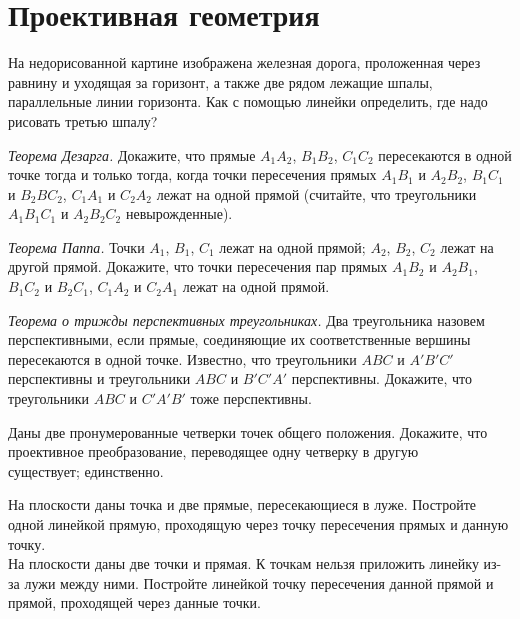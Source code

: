 

\section*{Проективная геометрия}


\begin{problems}

\item
На недорисованной картине изображена железная дорога, проложенная через равнину
и уходящая за горизонт, а также две рядом лежащие шпалы, параллельные линии
горизонта. Как с помощью линейки определить, где надо рисовать третью шпалу?

\item\emph{Теорема Дезарга.}
Докажите, что прямые $A_1 A_2$, $B_1 B_2$, $C_1 C_2$
пересекаются в одной точке тогда и только тогда, когда точки пересечения прямых
$A_1 B_1$ и $A_2 B_2$, $B_1 C_1$ и $B_2 B C_2$, $C_1 A_1$ и $C_2 A_2$ лежат на
одной прямой (считайте, что треугольники $A_1 B_1 C_1$ и $A_2 B_2 C_2$
невырожденные).

\item\emph{Теорема Паппа.}
Точки $A_1$, $B_1$, $C_1$ лежат на одной прямой;
$A_2$, $B_2$, $C_2$ лежат на другой прямой.
Докажите, что точки пересечения пар прямых $A_1 B_2$ и $A_2 B_1$,
$B_1 C_2$ и $B_2 C_1$, $C_1 A_2$ и $C_2 A_1$ лежат на одной прямой.

\item\emph{Теорема о трижды перспективных треугольниках.}
Два треугольника назовем перспективными, если прямые, соединяющие их
соответственные вершины пересекаются в одной точке.
Известно, что треугольники $A B C$ и $A' B' C'$ перспективны и треугольники
$A B C$ и $B' C' A'$ перспективны.
Докажите, что треугольники $A B C$ и $C' A' B'$ тоже перспективны.

\item
Даны две пронумерованные четверки точек общего положения.
Докажите, что проективное преобразование, переводящее одну четверку в другую
\\
\sbp существует;
\quad
\sbp единственно.

\item
\sbp
На плоскости даны точка и две прямые, пересекающиеся в луже.
Постройте одной линейкой прямую, проходящую через точку пересечения прямых и
данную точку.
\\
\sbp
На плоскости даны две точки и прямая.
К точкам нельзя приложить линейку из-за лужи между ними.
Постройте линейкой точку пересечения данной прямой и прямой, проходящей через
данные точки.


\end{problems}
